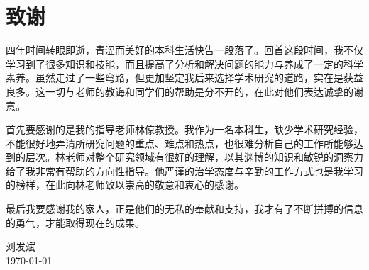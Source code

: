 
\chapter{致谢}

	四年时间转眼即逝，青涩而美好的本科生活快告一段落了。回首这段时间，我不仅学习到了很多知识和技能，而且提高了分析和解决问题的能力与养成了一定的科学素养。虽然走过了一些弯路，但更加坚定我后来选择学术研究的道路，实在是获益良多。这一切与老师的教诲和同学们的帮助是分不开的，在此对他们表达诚挚的谢意。

	首先要感谢的是我的指导老师林倞教授。我作为一名本科生，缺少学术研究经验，不能很好地弄清所研究问题的重点、难点和热点，也很难分析自己的工作所能够达到的层次。林老师对整个研究领域有很好的理解，以其渊博的知识和敏锐的洞察力给了我非常有帮助的方向性指导。他严谨的治学态度与辛勤的工作方式也是我学习的榜样，在此向林老师致以崇高的敬意和衷心的感谢。

	最后我要感谢我的家人，正是他们的无私的奉献和支持，我才有了不断拼搏的信息的勇气，才能取得现在的成果。

\vskip 108pt
\begin{flushright}
	刘发斌\makebox[1cm]{} \\
\today
\end{flushright}

